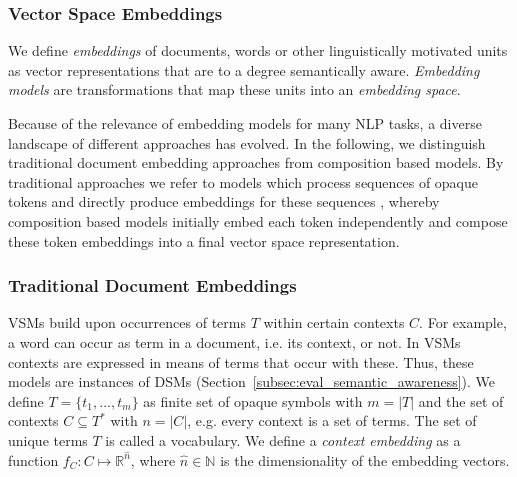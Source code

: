 \subsubsection{Vector Space Embeddings}
We define \textit{embeddings} of documents, words or other linguistically motivated units as vector representations that are to a degree semantically aware. \textit{Embedding models} are transformations that map these units into an \textit{embedding space}.

Because of the relevance of embedding models for many \ac{NLP} tasks, a diverse landscape of different approaches has evolved. In the following, we distinguish traditional document embedding approaches from composition based models. By traditional approaches we refer to models which process sequences of opaque tokens and directly produce embeddings for these sequences \autocite[see][for an exhaustive study]{turney_frequency_2010}, whereby composition based models \autocite{clark_compositional_2008,grefenstette_experimental_2011} initially embed each token independently and compose these token embeddings into a final vector space representation.

\subsubsection{Traditional Document Embeddings}
\label{subsec:doc_embedding}
\acfp{VSM} \autocite{turney_frequency_2010} build upon occurrences of terms $T$ within certain contexts $C$. For example, a word can occur as term in a document, i.e. its context, or not. In \acp{VSM} contexts are expressed in means of terms that occur with these. Thus, these models are instances of \acp{DSM} (Section~\ref{subsec:eval_semantic_awareness}).  We define $T = \{t_1, ..., t_m\}$ as finite set of opaque symbols with $m = |T|$ and the set of contexts $C \subseteq T^*$ 
with $n = |C|$, e.g. every context is a set of terms. 
The set of unique terms $T$ is called a vocabulary.%
We define a \textit{context embedding} as a function $f_C:C \mapsto \mathbb{R}^{\hat{n}}$, where $\hat{n} \in \mathbb{N}$ is the  dimensionality of the embedding vectors.

